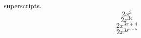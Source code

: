 \documentclass[11pt]{article}
\begin{document}
    superscripts. $$2x^3$$
    $$2x^{34}$$
    $$2x^{3x+4}$$
    $$2x^{3x^{4+5}}$$
\end{document}
